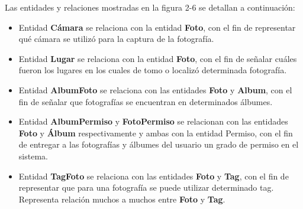 \documentclass{memoria}
\begin{document}
Las entidades y relaciones mostradas en la figura 2-6 se detallan a continuación:

\begin{itemize}
\item Entidad \textbf{Cámara} se relaciona con la entidad \textbf{Foto}, con el fin de representar qué cámara se utilizó para la captura de la fotografía.
\item Entidad \textbf{Lugar} se relaciona con la entidad \textbf{Foto}, con el fin de señalar cuáles fueron los lugares en los cuales de tomo o localizó determinada fotografía.
\item Entidad \textbf{AlbumFoto} se relaciona con las entidades \textbf{Foto} y \textbf{Album}, con el fin de señalar que fotografías se encuentran en determinados álbumes.
\item Entidad \textbf{AlbumPermiso} y \textbf{FotoPermiso} se relacionan con las entidades \textbf{Foto} y \textbf{Álbum} respectivamente y ambas con la entidad Permiso, con el fin de entregar a las fotografías y álbumes del usuario un grado de permiso en el sistema.
\item Entidad \textbf{TagFoto} se relaciona con las entidades \textbf{Foto} y \textbf{Tag}, con el fin de representar que para una fotografía se puede utilizar determinado tag. Representa relación muchos a muchos entre \textbf{Foto} y \textbf{Tag}.
\end{itemize}

\end{document}
